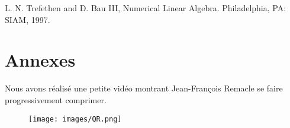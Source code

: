 \documentclass[11pt]{article}
\begin{document}
\begin{thebibliography}{9}
 L. N. Trefethen and D. Bau III, Numerical Linear Algebra. Philadelphia, PA: SIAM, 1997.

\end{thebibliography}

\section*{Annexes}
Nous avons réalisé une petite vidéo montrant Jean-François Remacle se faire progressivement comprimer.
\begin{figure}[H]
    \centering
    \texttt{[image: images/QR.png]}
\end{figure}
\end{document}
